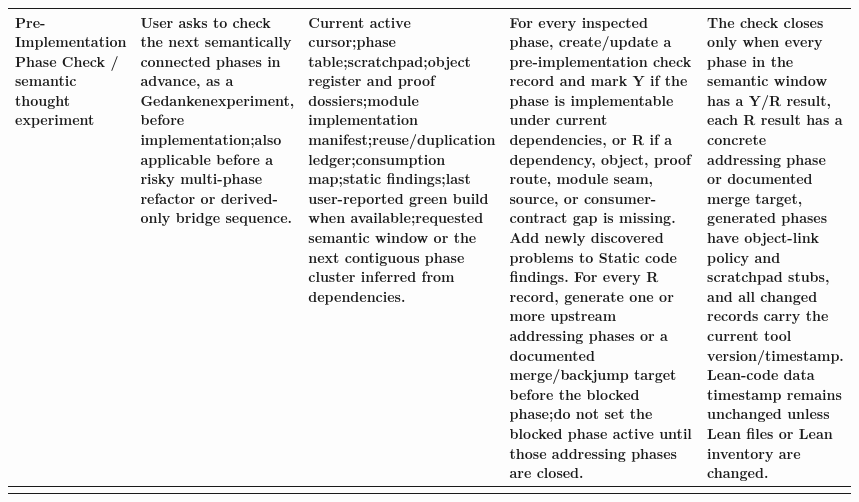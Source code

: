\begin{longtable}{L{0.14\linewidth} L{0.19\linewidth} L{0.18\linewidth} L{0.31\linewidth} L{0.16\linewidth}}
Pre-Implementation Phase Check /\allowbreak{} semantic thought experiment & User asks to check the next semantically connected phases in advance, as a Gedankenexperiment, before implementation;\newline also applicable before a risky multi-phase refactor or derived-only bridge sequence. & Current active cursor;\newline phase table;\newline scratchpad;\newline object register and proof dossiers;\newline module implementation manifest;\newline reuse/\allowbreak{}duplication ledger;\newline consumption map;\newline static findings;\newline last user-reported green build when available;\newline requested semantic window or the next contiguous phase cluster inferred from dependencies. & For every inspected phase, create/\allowbreak{}update a pre-implementation check record and mark Y if the phase is implementable under current dependencies, or R if a dependency, object, proof route, module seam, source, or consumer-contract gap is missing. Add newly discovered problems to Static code findings. For every R record, generate one or more upstream addressing phases or a documented merge/\allowbreak{}backjump target before the blocked phase;\newline do not set the blocked phase active until those addressing phases are closed. & The check closes only when every phase in the semantic window has a Y/\allowbreak{}R result, each R result has a concrete addressing phase or documented merge target, generated phases have object-link policy and scratchpad stubs, and all changed records carry the current tool version/\allowbreak{}timestamp. Lean-code data timestamp remains unchanged unless Lean files or Lean inventory are changed.\\
\hline
\addlinespace[0.24em]

\end{longtable}
